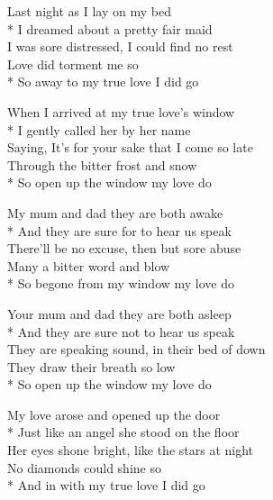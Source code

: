 
\versemark
Last night as I lay on my bed\\*
I dreamed about a pretty fair maid\\
I was sore distressed, I could find no rest\\
Love did torment me so\\*
So away to my true love I did go

\versemark
When I arrived at my true love’s window\\*
I gently called her by her name\\
Saying, It’s for your sake that I come so late\\
Through the bitter frost and snow\\*
So open up the window my love do

\versemark
My mum and dad they are both awake\\*
And they are sure for to hear us speak\\
There’ll be no excuse, then but sore abuse\\
Many a bitter word and blow\\*
So begone from my window my love do

\versemark
Your mum and dad they are both asleep\\*
And they are sure not to hear us speak\\
They are speaking sound, in their bed of down\\
They draw their breath so low\\*
So open up the window my love do

\versemark
My love arose and opened up the door\\*
Just like an angel she stood on the floor\\
Her eyes shone bright, like the stars at night\\
No diamonds could shine so\\*
And in with my true love I did go


